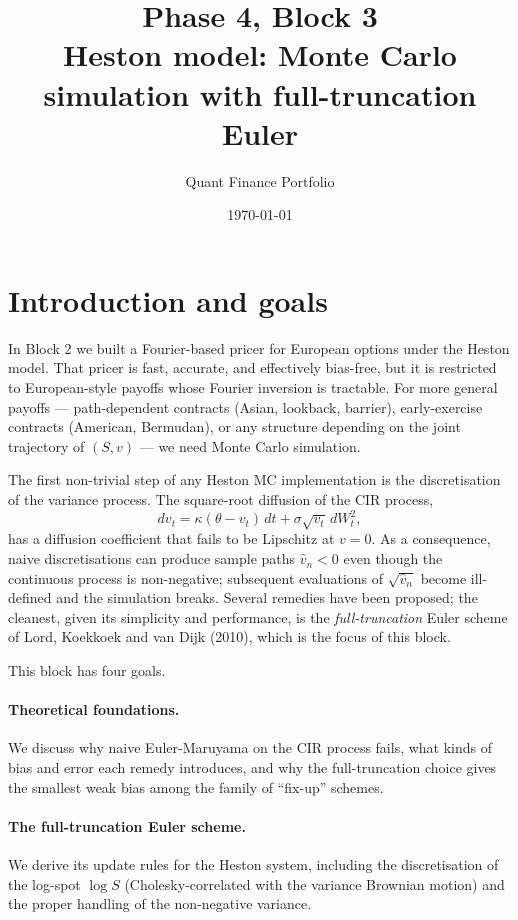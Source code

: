 \documentclass[11pt]{article}
\title{Phase 4, Block 3 \\[0.3em]\Large Heston model: Monte Carlo simulation with full-truncation Euler}
\author{Quant Finance Portfolio}
\date{\today}
\theoremstyle{plain}
\theoremstyle{definition}
\theoremstyle{remark}
\begin{document}
\maketitle
\tableofcontents
\bigskip

\section{Introduction and goals}

In Block 2 we built a Fourier-based pricer for European options under the Heston model. That pricer is fast, accurate, and effectively bias-free, but it is restricted to European-style payoffs whose Fourier inversion is tractable. For more general payoffs --- path-dependent contracts (Asian, lookback, barrier), early-exercise contracts (American, Bermudan), or any structure depending on the joint trajectory of $(S, v)$ --- we need Monte Carlo simulation.

The first non-trivial step of any Heston MC implementation is the discretisation of the variance process. The square-root diffusion of the CIR process,
\[
    dv_t = \kappa(\theta - v_t)\,dt + \sigma\sqrt{v_t}\,dW^2_t,
\]
has a diffusion coefficient that fails to be Lipschitz at $v = 0$. As a consequence, naive discretisations can produce sample paths $\hat v_n < 0$ even though the continuous process is non-negative; subsequent evaluations of $\sqrt{\hat v_n}$ become ill-defined and the simulation breaks. Several remedies have been proposed; the cleanest, given its simplicity and performance, is the \emph{full-truncation} Euler scheme of Lord, Koekkoek and van Dijk (2010), which is the focus of this block.

This block has four goals.

\paragraph{Theoretical foundations.} We discuss why naive Euler-Maruyama on the CIR process fails, what kinds of bias and error each remedy introduces, and why the full-truncation choice gives the smallest weak bias among the family of ``fix-up'' schemes.

\paragraph{The full-truncation Euler scheme.} We derive its update rules for the Heston system, including the discretisation of the log-spot $\log S$ (Cholesky-correlated with the variance Brownian motion) and the proper handling of the non-negative variance.
\end{document}
